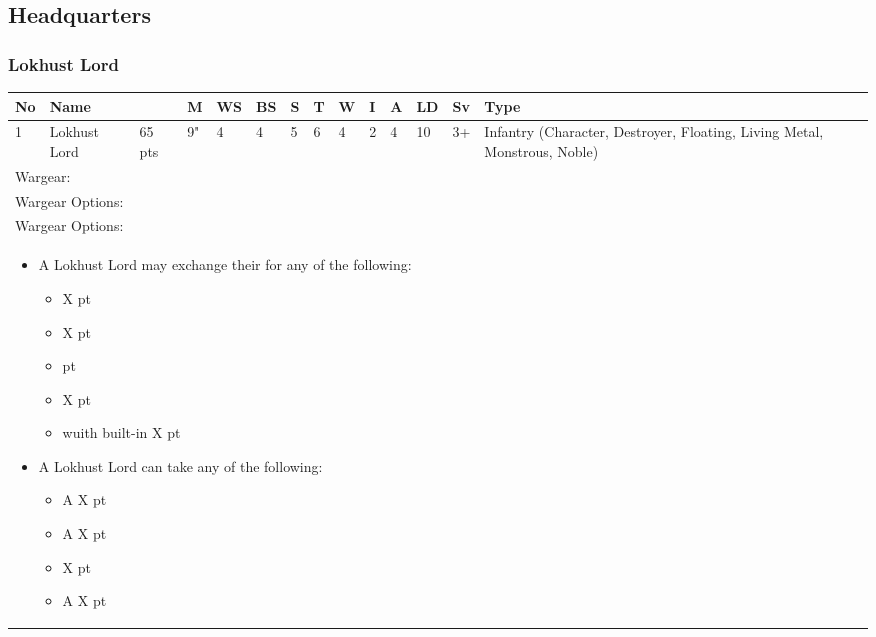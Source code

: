 \newpage
\subsection{Headquarters}

\subsubsection{Lokhust Lord}

\noindent
\begin{tabular}{||m{10pt} m{90pt} m{30pt} m{11pt} m{11pt} m{11pt} m{11pt} m{11pt} m{11pt} m{11pt} m{11pt} m{11pt} m{11pt} m{135pt}||}
	\hline
	No & Name & & M & WS & BS & S & T & W & I & A & LD & Sv & Type \\
	\hline
	1 & Lokhust Lord & 65 pts & 9" & 4 & 4 & 5 & 6 & 4 & 2 & 4 & 10 & 3+ & Infantry (Character, Destroyer, Floating, Living Metal, Monstrous, Noble)\\
	\hline
	\hline
	\multicolumn{14}{||Z{532 pt}||}{Wargear: \quickref{Staff of Light}}\\
	\multicolumn{14}{||Z{532 pt}||}{Wargear Options:} \\
	\multicolumn{14}{||Z{532 pt}||}{Wargear Options:} \\	
	\multicolumn{14}{||Z{532 pt}||}{\begin{itemize}
			\item A Lokhust Lord may exchange their \quickref{Staff of Light} for any of the following:
			\begin{itemize}
				\item \quickref{Hyperphase Sword} \hrulefill X pt
				\item \quickref{Rod of Night} \hrulefill X pt
				\item \quickref{Voidblade} \hrulefill 0 pt
				\item \quickref{Warscythe} \hrulefill X pt
				\item \quickref{Warscythe} wuith built-in \quickref{Relic Gauss Blaster} \hrulefill X pt
			\end{itemize}
			\item A Lokhust Lord can take any of the following:
			\begin{itemize}
				\item A \quickref{Gauntlet of Fire} \hrulefill X pt
				\item A \quickref{Tachyon Arrow} \hrulefill X pt
				\item \quickref{Mindshackle Scarabs} \hrulefill X pt
				\item A \quickref{Phase Shifter} \hrulefill X pt

\end{itemize}
\end{itemize}}
\end{tabular}

